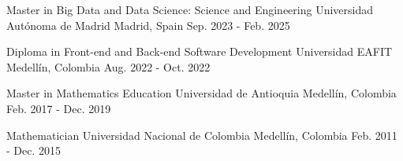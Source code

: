 
\begin{cventries}

\cventry
{Master in Big Data and Data Science: Science and Engineering}
{Universidad Autónoma de Madrid}
{Madrid, Spain}
{Sep. 2023 - Feb. 2025}
{}

\cventry
{Diploma in Front-end and Back-end Software Development}
{Universidad EAFIT}
{Medellín, Colombia}
{Aug. 2022 - Oct. 2022}
{}

\cventry
{Master in Mathematics Education}
{Universidad de Antioquia}
{Medellín, Colombia}
{Feb. 2017 - Dec. 2019}
{}

\cventry
{Mathematician}
{Universidad Nacional de Colombia}
{Medellín, Colombia}
{Feb. 2011 - Dec. 2015}
{}

\end{cventries}
